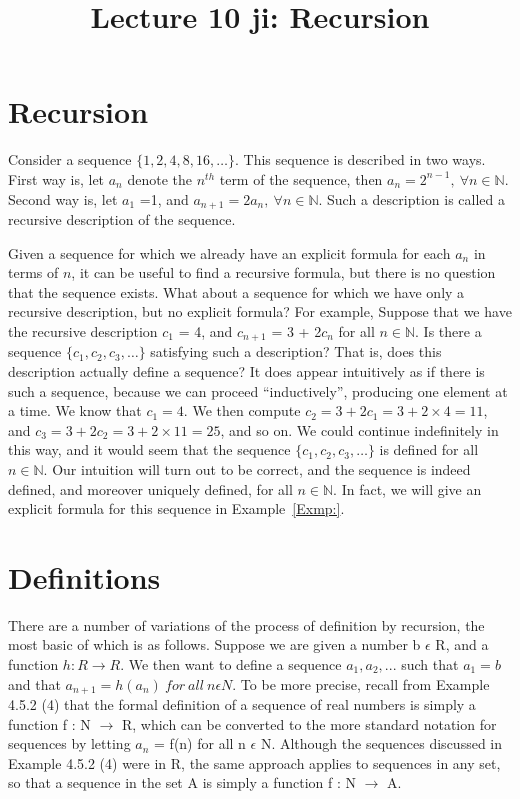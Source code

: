 \documentclass[a4paper,english,12pt]{article}
\title{Lecture 10	ji: Recursion}
\author{}
\begin{document}
\maketitle
\section{Recursion}
Consider a sequence $\{1, 2, 4, 8, 16, \ldots\}$. This sequence is described in two ways. First way is, let $a_n$ denote the $n^{th}$ term of the sequence, then $a_n=2^{n-1},~ \forall n\in \mathbb{N}$. Second way is, let $a_1$ =1, and $a_{n+1}=2a_n,~ \forall n\in \mathbb{N}$. Such a description is called a recursive description of the sequence.

Given a sequence for which we already have an explicit formula for each $a_n$ in terms of $n$, it can be useful to find a recursive formula, but there is no question that the sequence exists. What about a sequence for which we have only a recursive description, but no explicit formula?
For example, Suppose that we have the recursive description $c_1$ = 4, and $c_{n+1}$ = 3 + 2$c_n$ for all $n \in \mathbb{N}$. Is there a sequence $\{c_1, c_2, c_3, \ldots \}$ satisfying such a description? That is, does this description actually define a sequence? It does appear intuitively as if there is such a sequence, because we can proceed “inductively”, producing one element at a time. We know that $c_1 = 4$. We then compute $c_2 = 3 + 2 c_1 = 3 + 2 \times 4 = 11$, and $c_3 = 3 + 2c_2 = 3 + 2 \times 11 = 25$, and so on. We could continue indefinitely in this way, and it would seem that the sequence $\{c_1, c_2, c_3, \ldots \}$ is defined for all $n \in \mathbb{N}$. Our intuition will turn out to be correct, and the sequence is indeed defined, and moreover uniquely defined, for all $n \in \mathbb{N}$. In fact, we will give an explicit formula for this sequence in Example~\ref{Exmp:}.

\section{Definitions}
There are a number of variations of the process of definition by recursion, the most basic of which is as follows. Suppose we are given a number b $\epsilon$ R, and a function $h:R\rightarrow R$. We then want to define a sequence $a_1,a_2, ...$ such that $a_1=b$ and that $a_{n+1}=h(a_n)~for ~all~  n \epsilon N$. To be more precise, recall from Example 4.5.2 (4) that the formal definition of a sequence of real numbers is simply a function f : N $\rightarrow$ R, which can be converted to the more standard notation for sequences by letting $a_n$ = f(n) for all n $\epsilon$ N. Although the sequences discussed in Example 4.5.2 (4) were in R, the same approach applies to sequences in any set, so that a sequence in the set A is simply a function f : N $\rightarrow$ A.
\end{document}
